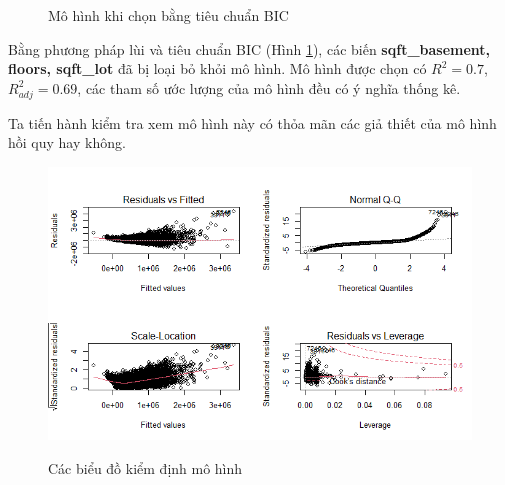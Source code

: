 \begin{figure}[H]
	\centering
	\hfill
	\caption{Mô hình khi chọn bằng tiêu chuẩn BIC}
	\label{B2_BIC}
\end{figure}
 Bằng phương pháp lùi và tiêu chuẩn BIC (Hình \ref{B2_BIC}), các biến \textbf{sqft\_basement, floors, sqft\_lot} đã bị loại bỏ khỏi mô hình. Mô hình được chọn có $R^2=0.7$, $R^2_{adj}=0.69$, các tham số ước lượng của mô hình đều có ý nghĩa thống kê.
 
 Ta tiến hành kiểm tra xem mô hình này có thỏa mãn các giả thiết của mô hình hồi quy hay không.
 
 \begin{figure}[H]
 	\centering
 	{\includegraphics[width=.7\linewidth]{../Photo Of Result/B2_originalmodel}}
 	\caption{Các biểu đồ kiểm định mô hình}
 	\label{B2_check}
 \end{figure}
 
